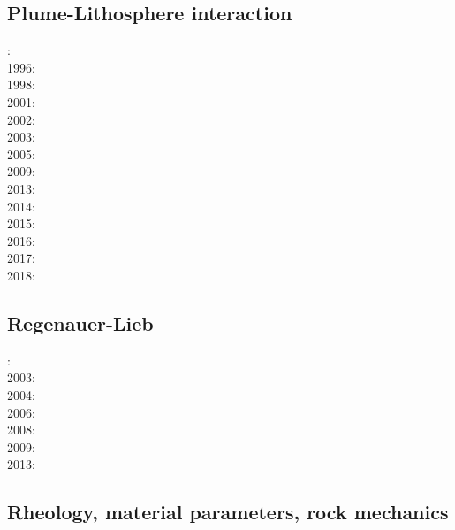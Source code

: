 \subsection*{Plume-Lithosphere interaction}

: \cite{rich94}\\
1996: \cite{zhgm96}\\
1998: \cite{bisp98}\\
2001: \cite{vapy01}\\
2002: \cite{foul02}\\
2003: \cite{vazh03}\\
2005: \cite{bugu05}\\
2009: \cite{bucl09}\cite{zhgy09}\cite{baiv10}\\
2013: \cite{bemm13}\cite{brps13}\\
2014: \cite{buge14}\\
2015: \cite{bemm15}\cite{gesb15}\cite{kocb15}\cite{meds15}\\
2016: \cite{fige16}\cite{gadb16}\\
2017: \cite{bahf17}\cite{brsg17}\\
2018: \cite{daga18}

\subsection*{Regenauer-Lieb}

: \cite{reyu00}\\
2003: \cite{reyu03}\\
2004: \cite{reyu04}\\
2006: \cite{rehy06}\cite{rewr06}\\
2008: \cite{rerw08}\\
2009: \cite{reps09}\\
2013: \cite{revp13}

\subsection*{Rheology, material parameters, rock mechanics}

